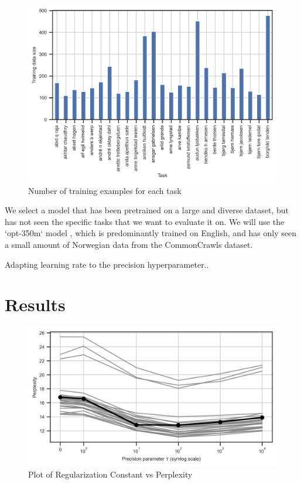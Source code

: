 \documentclass{article}
\begin{document}
\begin{figure}[h] \label{fig:task_len}
    \centering
    \includegraphics[width=\textwidth]{figures/training_lengths.png}
    \caption{Number of training examples for each task}
    \label{fig:training_lengths}
\end{figure}

We select a model that has been pretrained on a large and diverse dataset, but has not seen the specific tasks that we want to evaluate it on. We will use the `opt-350m` model \cite{zhang_opt_2022}, which is predominantly trained on English, and has only seen a small amount of Norwegian data from the CommonCrawls dataset.

Adapting learning rate to the precision hyperparameter..

\section{Results}

\begin{figure}[h]
    \centering
    \includegraphics[width=\textwidth]{figures/results_plot.png}
    \caption{Plot of Regularization Constant vs Perplexity}
    \label{fig:results_plot}
\end{figure}
\end{document}

